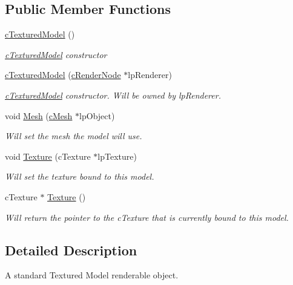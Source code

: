 \subsection*{Public Member Functions}
\begin{DoxyCompactItemize}
\item 
\hypertarget{classc_textured_model_a9f3b3307b1b84971f5386c5346537cf1}{
\hyperlink{classc_textured_model_a9f3b3307b1b84971f5386c5346537cf1}{cTexturedModel} ()}
\label{classc_textured_model_a9f3b3307b1b84971f5386c5346537cf1}

\begin{DoxyCompactList}\small\item\em \hyperlink{classc_textured_model}{cTexturedModel} constructor \end{DoxyCompactList}\item 
\hypertarget{classc_textured_model_afd2b15449dc747d6dc1d2985373192a3}{
\hyperlink{classc_textured_model_afd2b15449dc747d6dc1d2985373192a3}{cTexturedModel} (\hyperlink{classc_render_node}{cRenderNode} $\ast$lpRenderer)}
\label{classc_textured_model_afd2b15449dc747d6dc1d2985373192a3}

\begin{DoxyCompactList}\small\item\em \hyperlink{classc_textured_model}{cTexturedModel} constructor. Will be owned by lpRenderer. \end{DoxyCompactList}\item 
\hypertarget{classc_textured_model_a050b6f1987d5e228d0df1c3a4a240af5}{
void \hyperlink{classc_textured_model_a050b6f1987d5e228d0df1c3a4a240af5}{Mesh} (\hyperlink{classc_mesh}{cMesh} $\ast$lpObject)}
\label{classc_textured_model_a050b6f1987d5e228d0df1c3a4a240af5}

\begin{DoxyCompactList}\small\item\em Will set the mesh the model will use. \end{DoxyCompactList}\item 
\hypertarget{classc_textured_model_a4197c47fcbe7072ebd5cc12384e830fb}{
void \hyperlink{classc_textured_model_a4197c47fcbe7072ebd5cc12384e830fb}{Texture} (cTexture $\ast$lpTexture)}
\label{classc_textured_model_a4197c47fcbe7072ebd5cc12384e830fb}

\begin{DoxyCompactList}\small\item\em Will set the texture bound to this model. \end{DoxyCompactList}\item 
\hypertarget{classc_textured_model_a2814557e9079011a1cd107383e04ec27}{
cTexture $\ast$ \hyperlink{classc_textured_model_a2814557e9079011a1cd107383e04ec27}{Texture} ()}
\label{classc_textured_model_a2814557e9079011a1cd107383e04ec27}

\begin{DoxyCompactList}\small\item\em Will return the pointer to the cTexture that is currently bound to this model. \end{DoxyCompactList}\end{DoxyCompactItemize}


\subsection{Detailed Description}
A standard Textured Model renderable object. 